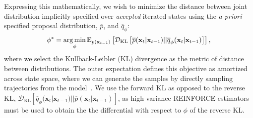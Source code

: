 Expressing this mathematically, we wish to minimize the distance between joint distribution implicitly specified over \emph{accepted} iterated states using the \emph{a priori} specified proposal distribution, $\overline{p}$, and $\overline{q}_{\phi}$:
\begin{equation}
    \phi^* = \operatorname*{arg\,min}_{\phi} \mathbb{E}_{p(\mathbf{x}_{t-1})} \left[ \mathcal{D}_{\text{KL}} \left[ \overline{p}(\mathbf{x}_t | \mathbf{x}_{t-1}) || \overline{q}_{\phi}(\mathbf{x}_t | \mathbf{x}_{t-1}) \right] \right],\label{equ:sim:target}
\end{equation}
where we select the Kullback-Leibler (KL) divergence as the metric of distance between distributions.
The outer expectation defines this objective as amortized across state space, where we can generate the samples by directly sampling trajectories from the model~\citep{le2016inference, gershman2014amortized}.
We use the forward KL as opposed to the reverse KL, $\mathcal{D}_{\text{KL}} \left[ \overline{q}_{\phi}(\mathbf{x}_t | \mathbf{x}_{t-1}) || \overline{p}(\mathbf{x}_t | \mathbf{x}_{t-1}) \right]$, as high-variance REINFORCE estimators must be used to obtain the the differential with respect to $\phi$ of the reverse KL. 

